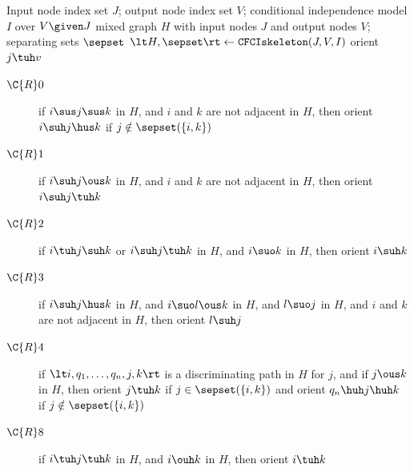 \begin{algorithm}
\begin{algorithmic}[1]
  \Input Input node index set $J$; output node index set $V$; conditional independence model $I$ over $V \given J$
  \Output mixed graph $H$ with input nodes $J$ and output nodes $V$; separating sets $\sepset$
  \State $\lt H,\sepset \rt \leftarrow \mathtt{CFCIskeleton}(J,V,I)$\label{alg:cfci:skeleton}
  \label{alg:cfci:orientJ}\label{alg:cfci:start_orient}
    \State orient $j \tuh v$
  \EndFor
  \Repeat \label{alg:fci:R0}
    \begin{description}
      \item[$\C{R}0$] if $i \sus j \sus k$ in $H$, and $i$ and $k$ are not adjacent in $H$, then orient $i \suh j \hus k$ if $j \notin \sepset(\{i,k\})$ %
    \end{description}
  \Repeat
    \begin{description}
      \item[$\C{R}1$] if $i \suh j \ous k$ in $H$, and $i$ and $k$ are not adjacent in $H$, then orient $i \suh j \tuh k$
      \item[$\C{R}2$] if $i \tuh j \suh k$ or $i \suh j \tuh k$ in $H$, and $i \suo k$ in $H$, then orient $i \suh k$
      \item[$\C{R}3$] if $i \suh j \hus k$ in $H$, and $i \suo l \ous k$ in $H$, and $l \suo j$ in $H$, and $i$ and $k$ are not adjacent in $H$, then orient $l \suh j$
      \item[$\C{R}4$] if $\lt i, q_1, \dots, q_n, j, k \rt$ is a discriminating path in $H$ for $j$, and if $j \ous k$ in $H$, then orient $j \tuh k$ if $j \in \sepset(\{i,k\})$ and orient $q_n \huh j \huh k$ if $j \notin \sepset(\{i,k\})$ %
    \end{description}
  \Repeat
    \begin{description}
      \item[$\C{R}8$] if $i \tuh j \tuh k$ in $H$, and $i \ouh k$ in $H$, then orient $i \tuh k$

\end{description}
\end{algorithmic}
\end{algorithm}
